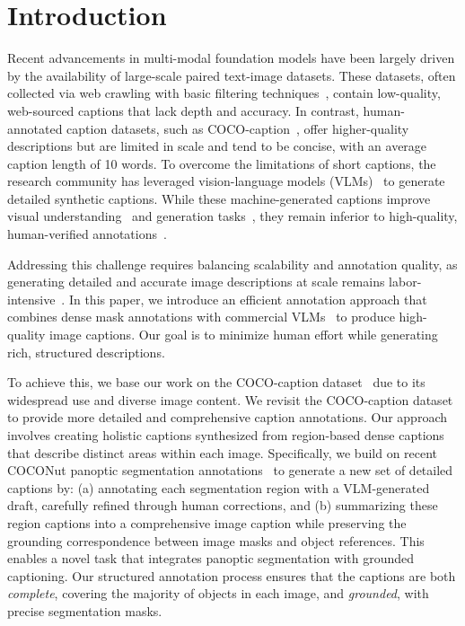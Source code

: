 \section{Introduction}
Recent advancements in multi-modal foundation models have been largely driven by the availability of large-scale paired text-image datasets. These datasets, often collected via web crawling with basic filtering techniques~\cite{schuhmann2021laion400m,schuhmann2022laion5b,gadre2024datacomp}, contain low-quality, web-sourced captions that lack depth and accuracy. In contrast, human-annotated caption datasets, such as COCO-caption~\cite{chen2015coco_caption}, offer higher-quality descriptions but are limited in scale and tend to be concise, with an average caption length of 10 words. To overcome the limitations of short captions, the research community has leveraged vision-language models (VLMs)~\cite{liu2024llavanext,li2024recaption,li2024DenseFusion,chen2023sharegpt4v,team2023gemini} to generate detailed synthetic captions. While these machine-generated captions improve visual understanding~\cite{li2024DenseFusion,chen2023sharegpt4v} and generation tasks~\cite{li2024recaption}, they remain inferior to high-quality, human-verified annotations~\cite{Onoe2024docci}.






Addressing this challenge requires balancing scalability and annotation quality, as generating detailed and accurate image descriptions at scale remains labor-intensive~\cite{garg2024imageinwords,Onoe2024docci}. In this paper, we introduce an efficient annotation approach that combines dense mask annotations with commercial VLMs~\cite{chen2023sharegpt4v} to produce high-quality image captions. Our goal is to minimize human effort while generating rich, structured descriptions. 

To achieve this, we base our work on the COCO-caption dataset~\cite{chen2015coco_caption} due to its widespread use and diverse image content.
We revisit the COCO-caption dataset to provide more detailed and comprehensive caption annotations.
Our approach involves creating holistic captions synthesized from region-based dense captions that describe distinct areas within each image. Specifically, we build on recent COCONut panoptic segmentation annotations~\cite{deng2024coconut} to generate a new set of detailed captions by: (a) annotating each segmentation region with a VLM-generated draft, carefully refined through human corrections, and (b) summarizing these region captions into a comprehensive image caption while preserving the grounding correspondence between image masks and object references. This enables a novel task that integrates panoptic segmentation with grounded captioning.
Our structured annotation process ensures that the captions are both \textit{complete}, covering the majority of objects in each image, and \textit{grounded}, with precise segmentation masks.


